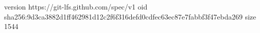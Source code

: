 version https://git-lfs.github.com/spec/v1
oid sha256:9d3ca3882d1ff462981d12c2f6f316defd0cdfec63ec87e7fabbf3f47ebda269
size 1544
